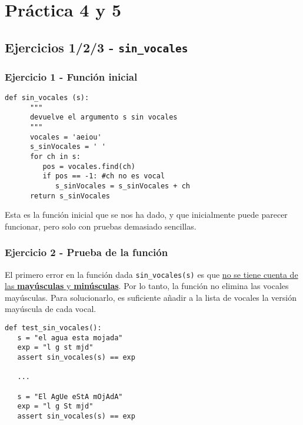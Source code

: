\chapter{Práctica 4 y 5}

\lstset{language=python}


\section{Ejercicios 1/2/3 - \texttt{sin\_vocales}}

\subsection{Ejercicio 1 - Función inicial}
\begin{lstlisting}[captionpos=b,caption={Función inicial}]
   def sin_vocales (s):
      """
      devuelve el argumento s sin vocales
      """
      vocales = 'aeiou'
      s_sinVocales = ' '
      for ch in s:
         pos = vocales.find(ch)
         if pos == -1: #ch no es vocal
            s_sinVocales = s_sinVocales + ch
      return s_sinVocales
\end{lstlisting}

Esta es la función inicial que se nos ha dado, y que inicialmente puede parecer funcionar, pero solo con pruebas demasiado sencillas.

\subsection{Ejercicio 2 - Prueba de la función}



\begin{paracol}{2}
   \colfill
   El primero error en la función dada \lstinline{sin_vocales(s)} es que \ul{no se tiene cuenta de las \textbf{mayúsculas} y \textbf{minúsculas}}. Por lo tanto, la función no elimina las vocales mayúsculas. Para solucionarlo, es suficiente añadir a la lista de vocales la versión mayúscula de cada vocal.
   \colfill

   \switchcolumn

   \begin{lstlisting}
def test_sin_vocales():
   s = "el agua esta mojada"
   exp = "l g st mjd"
   assert sin_vocales(s) == exp

   ...
      
   s = "El AgUe eStA mOjAdA"
   exp = "l g St mjd"
   assert sin_vocales(s) == exp
   \end{lstlisting}
\end{paracol}

